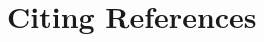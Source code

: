 \documentclass[output=paper,colorlinks,citecolor=brown,
]{langscibook}
\begin{document}




\section{Citing References}
\end{document}
